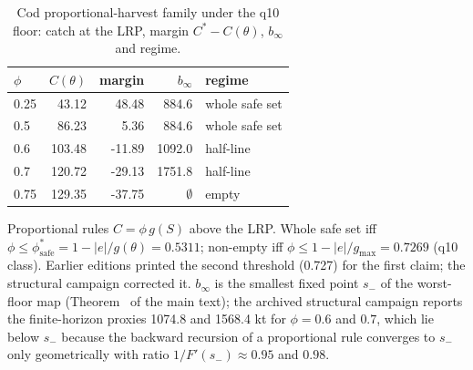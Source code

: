 \begin{table}[H]
\centering
\caption{Cod proportional-harvest family under the q10 floor: catch at the LRP, margin $C^*-C(\theta)$, $b_\infty$ and regime.}
\label{tab:si-family}
\small
\begin{tabular}{lrrrl}
\toprule
$\phi$ & $C(\theta)$ & margin & $b_\infty$ & regime \\
\midrule
0.25 & 43.12 & 48.48 & 884.6 & whole safe set \\
0.5 & 86.23 & 5.36 & 884.6 & whole safe set \\
0.6 & 103.48 & -11.89 & 1092.0 & half-line \\
0.7 & 120.72 & -29.13 & 1751.8 & half-line \\
0.75 & 129.35 & -37.75 & $\emptyset$ & empty \\
\bottomrule
\end{tabular}
\par\smallskip\begin{minipage}{0.97\linewidth}\footnotesize Proportional rules $C=\phi\,g(S)$ above the LRP. Whole safe set iff $\phi\le\phi^*_{\mathrm{safe}}=1-|e|/g(\theta)=0.5311$; non-empty iff $\phi\le 1-|e|/g_{\max}=0.7269$ (q10 class). Earlier editions printed the second threshold (0.727) for the first claim; the structural campaign corrected it. $b_\infty$ is the smallest fixed point $s_-$ of the worst-floor map (Theorem~ of the main text); the archived structural campaign reports the finite-horizon proxies 1074.8 and 1568.4 kt for $\phi=0.6$ and $0.7$, which lie below $s_-$ because the backward recursion of a proportional rule converges to $s_-$ only geometrically with ratio $1/F'(s_-)\approx0.95$ and $0.98$.\end{minipage}
\end{table}
